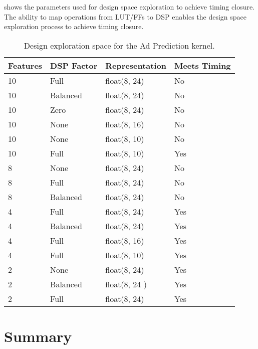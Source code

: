  shows the parameters used for design space
exploration to achieve timing closure. The ability to map operations
from LUT/FFs to DSP enables the design space exploration process to
achieve timing closure.
\begin{table}
\renewcommand{\arraystretch}{1.2}
\begin{tabularx}{\textwidth}{X|X|X|X}
  \textbf{Features} & \textbf{DSP Factor} & \textbf{Representation} & \textbf{Meets Timing} \\
 \hline \hline
 10        & Full       & float(8, 24)   & No           \\
 10        & Balanced   & float(8, 24)   & No           \\
 10        & Zero       & float(8, 24)   & No           \\
 10        & None       & float(8, 16)   & No           \\
 10        & None       & float(8, 10)   & No          \\
 10        & Full       & float(8, 10)   & Yes          \\
 8         & None       & float(8, 24)   & No           \\
 8         & Full       & float(8, 24)   & No           \\
 8         & Balanced   & float(8, 24)   & No           \\
 4         & Full       & float(8, 24)   & Yes          \\
 4         & Balanced   & float(8, 24)   & Yes          \\
 4         & Full       & float(8, 16)   & Yes          \\
 4         & Full       & float(8, 10)   & Yes          \\
 2         & None       & float(8, 24)   & Yes          \\
 2         & Balanced   & float(8, 24 )  & Yes          \\
 2         & Full       & float(8, 24)   & Yes          \\

\end{tabularx}
\caption{Design exploration space for the Ad Prediction kernel.}
\label{table:adp-dse}
\end{table}

\section{Summary}

